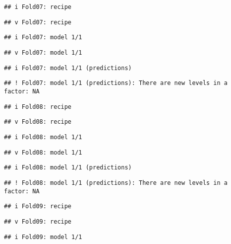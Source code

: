 \documentclass[
]{article}
\begin{document}
\begin{verbatim}
## i Fold07: recipe
\end{verbatim}

\begin{verbatim}
## v Fold07: recipe
\end{verbatim}

\begin{verbatim}
## i Fold07: model 1/1
\end{verbatim}

\begin{verbatim}
## v Fold07: model 1/1
\end{verbatim}

\begin{verbatim}
## i Fold07: model 1/1 (predictions)
\end{verbatim}

\begin{verbatim}
## ! Fold07: model 1/1 (predictions): There are new levels in a factor: NA
\end{verbatim}

\begin{verbatim}
## i Fold08: recipe
\end{verbatim}

\begin{verbatim}
## v Fold08: recipe
\end{verbatim}

\begin{verbatim}
## i Fold08: model 1/1
\end{verbatim}

\begin{verbatim}
## v Fold08: model 1/1
\end{verbatim}

\begin{verbatim}
## i Fold08: model 1/1 (predictions)
\end{verbatim}

\begin{verbatim}
## ! Fold08: model 1/1 (predictions): There are new levels in a factor: NA
\end{verbatim}

\begin{verbatim}
## i Fold09: recipe
\end{verbatim}

\begin{verbatim}
## v Fold09: recipe
\end{verbatim}

\begin{verbatim}
## i Fold09: model 1/1
\end{verbatim}
\end{document}
